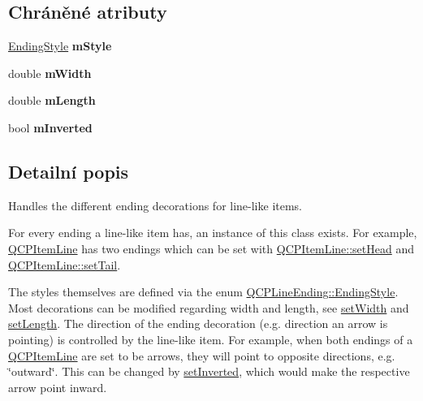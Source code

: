 \subsection*{Chráněné atributy}
\begin{DoxyCompactItemize}
\item 
\hypertarget{classQCPLineEnding_a4696fc9117b60f1ca7690fcd2ba56611}{}\hyperlink{classQCPLineEnding_a5ef16e6876b4b74959c7261d8d4c2cd5}{Ending\+Style} {\bfseries m\+Style}\label{classQCPLineEnding_a4696fc9117b60f1ca7690fcd2ba56611}

\item 
\hypertarget{classQCPLineEnding_aca89d21341133c20dc6825c33a5eac48}{}double {\bfseries m\+Width}\label{classQCPLineEnding_aca89d21341133c20dc6825c33a5eac48}

\item 
\hypertarget{classQCPLineEnding_ae8e1e2566b96c05736cd92662dba8af8}{}double {\bfseries m\+Length}\label{classQCPLineEnding_ae8e1e2566b96c05736cd92662dba8af8}

\item 
\hypertarget{classQCPLineEnding_a91306fe771d54c955e0af21af14349d5}{}bool {\bfseries m\+Inverted}\label{classQCPLineEnding_a91306fe771d54c955e0af21af14349d5}

\end{DoxyCompactItemize}


\subsection{Detailní popis}
Handles the different ending decorations for line-\/like items. 

 For every ending a line-\/like item has, an instance of this class exists. For example, \hyperlink{classQCPItemLine}{Q\+C\+P\+Item\+Line} has two endings which can be set with \hyperlink{classQCPItemLine_aebf3d687114d584e0459db6759e2c3c3}{Q\+C\+P\+Item\+Line\+::set\+Head} and \hyperlink{classQCPItemLine_ac264222c3297a7efe33df9345c811a5f}{Q\+C\+P\+Item\+Line\+::set\+Tail}.

The styles themselves are defined via the enum \hyperlink{classQCPLineEnding_a5ef16e6876b4b74959c7261d8d4c2cd5}{Q\+C\+P\+Line\+Ending\+::\+Ending\+Style}. Most decorations can be modified regarding width and length, see \hyperlink{classQCPLineEnding_a26dc020ea985a72cc25881ce2115e34e}{set\+Width} and \hyperlink{classQCPLineEnding_ae36fa01763751cd64b7f56c3507e935a}{set\+Length}. The direction of the ending decoration (e.\+g. direction an arrow is pointing) is controlled by the line-\/like item. For example, when both endings of a \hyperlink{classQCPItemLine}{Q\+C\+P\+Item\+Line} are set to be arrows, they will point to opposite directions, e.\+g. \char`\"{}outward\char`\"{}. This can be changed by \hyperlink{classQCPLineEnding_a580e4e2360b35ebb8d68f3494aa2335d}{set\+Inverted}, which would make the respective arrow point inward.

